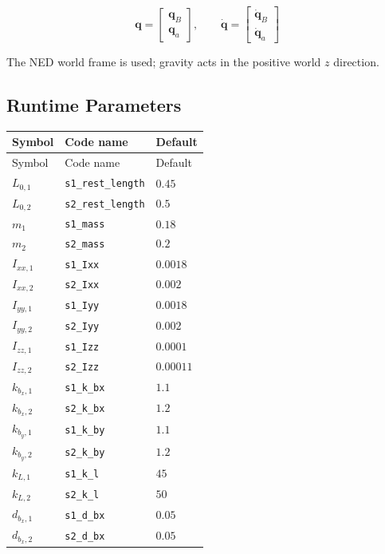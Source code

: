 \documentclass[11pt]{article}
\begin{document}
\begin{equation}
\boldsymbol q=\begin{bmatrix}\boldsymbol q_B\\\boldsymbol q_a\end{bmatrix},\qquad \dot{\boldsymbol q}=\begin{bmatrix}\dot{\boldsymbol q}_B\\\dot{\boldsymbol q}_a\end{bmatrix}
\end{equation}

The NED world frame is used; gravity acts in the positive world $z$ direction.
\subsection{Runtime Parameters}
\begin{longtable}{lll}
\hline
Symbol & Code name & Default \\
\hline
\endfirsthead
\hline Symbol & Code name & Default \\
\hline
\endhead
$L_{0,1}$ & \texttt{s1\_rest\_length} & $0.45$ \\
$L_{0,2}$ & \texttt{s2\_rest\_length} & $0.5$ \\
$m_{1}$ & \texttt{s1\_mass} & $0.18$ \\
$m_{2}$ & \texttt{s2\_mass} & $0.2$ \\
$I_{xx,1}$ & \texttt{s1\_Ixx} & $0.0018$ \\
$I_{xx,2}$ & \texttt{s2\_Ixx} & $0.002$ \\
$I_{yy,1}$ & \texttt{s1\_Iyy} & $0.0018$ \\
$I_{yy,2}$ & \texttt{s2\_Iyy} & $0.002$ \\
$I_{zz,1}$ & \texttt{s1\_Izz} & $0.0001$ \\
$I_{zz,2}$ & \texttt{s2\_Izz} & $0.00011$ \\
$k_{b_x,1}$ & \texttt{s1\_k\_bx} & $1.1$ \\
$k_{b_x,2}$ & \texttt{s2\_k\_bx} & $1.2$ \\
$k_{b_y,1}$ & \texttt{s1\_k\_by} & $1.1$ \\
$k_{b_y,2}$ & \texttt{s2\_k\_by} & $1.2$ \\
$k_{L,1}$ & \texttt{s1\_k\_l} & $45$ \\
$k_{L,2}$ & \texttt{s2\_k\_l} & $50$ \\
$d_{b_x,1}$ & \texttt{s1\_d\_bx} & $0.05$ \\
$d_{b_x,2}$ & \texttt{s2\_d\_bx} & $0.05$ \\

\end{longtable}
\end{document}
